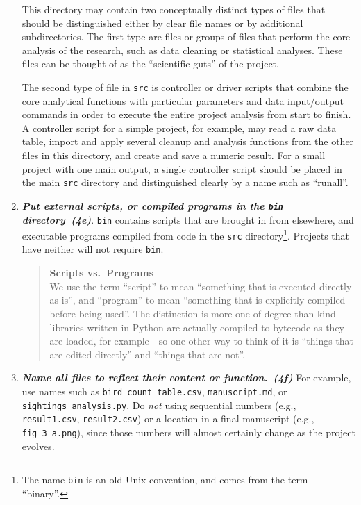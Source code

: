 \documentclass[10pt,letterpaper]{article}
\newcommand{\practice}[2]{\textbf{\emph{{#2}~({#1})}}}
\begin{document}
\begin{enumerate}
    This directory may contain two conceptually distinct types
    of files that should be distinguished either by clear file names or by
    additional subdirectories. The first type are files or
    groups of files that perform the core
    analysis of the research, such as data cleaning or statistical analyses.
    These files can be thought of as the
    ``scientific guts'' of the project.

    The second type of file in \texttt{src} is controller or driver
    scripts that combine the core analytical functions with particular
    parameters and data input/output commands in order to execute the
    entire project analysis from start to finish. A controller script for
    a simple project, for example, may read a raw data table, import and
    apply several cleanup and analysis functions from the other files in
    this directory, and create and save a numeric result. For a small
    project with one main output, a single controller script should be
    placed in the main \texttt{src} directory and distinguished clearly by
    a name such as ``runall''.

\item
  \practice{4e}{Put external scripts, or compiled programs
   in the \texttt{bin} directory}.  \texttt{bin} contains
  scripts that are brought in from elsewhere, and executable programs
  compiled from code in the \texttt{src} directory\footnote{The name
    \texttt{bin} is an old Unix convention, and comes from the term
    ``binary''.}. Projects that have neither will not require \texttt{bin}.

  \begin{quote}
    \noindent \textbf{Scripts vs.\ Programs}
    \\
    We use the term ``script'' to mean ``something that is executed
    directly as-is'', and ``program'' to mean ``something that is
    explicitly compiled before being used''.  The distinction is more
    one of degree than kind---libraries written in Python are actually
    compiled to bytecode as they are loaded, for example---so one
    other way to think of it is ``things that are edited directly''
    and ``things that are not''.
  \end{quote}

\item
  \practice{4f}{Name all files to reflect their content or function.} For
  example, use names such as \texttt{bird\_count\_table.csv},
  \texttt{manuscript.md}, or \texttt{sightings\_analysis.py}.  Do
  \emph{not} using sequential numbers (e.g., \texttt{result1.csv},
  \texttt{result2.csv}) or a location in a final manuscript (e.g.,
  \texttt{fig\_3\_a.png}), since those numbers will almost certainly
  change as the project evolves.

\end{enumerate}
\end{document}
